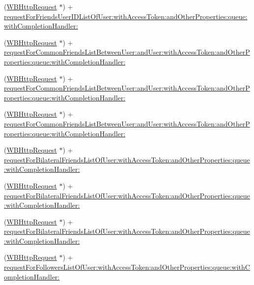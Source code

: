 \begin{DoxyCompactItemize}
(\mbox{\hyperlink{interface_w_b_http_request}{W\+B\+Http\+Request}} $\ast$) + \mbox{\hyperlink{interface_w_b_http_request_a388ba16ea6e89e121893833f2a7d7b86}{request\+For\+Friends\+User\+I\+D\+List\+Of\+User\+:with\+Access\+Token\+:and\+Other\+Properties\+:queue\+:with\+Completion\+Handler\+:}}
\item 
(\mbox{\hyperlink{interface_w_b_http_request}{W\+B\+Http\+Request}} $\ast$) + \mbox{\hyperlink{interface_w_b_http_request_a869234d6cc01353dcfc8f0f47ad06f5c}{request\+For\+Common\+Friends\+List\+Between\+User\+:and\+User\+:with\+Access\+Token\+:and\+Other\+Properties\+:queue\+:with\+Completion\+Handler\+:}}
\item 
(\mbox{\hyperlink{interface_w_b_http_request}{W\+B\+Http\+Request}} $\ast$) + \mbox{\hyperlink{interface_w_b_http_request_a869234d6cc01353dcfc8f0f47ad06f5c}{request\+For\+Common\+Friends\+List\+Between\+User\+:and\+User\+:with\+Access\+Token\+:and\+Other\+Properties\+:queue\+:with\+Completion\+Handler\+:}}
\item 
(\mbox{\hyperlink{interface_w_b_http_request}{W\+B\+Http\+Request}} $\ast$) + \mbox{\hyperlink{interface_w_b_http_request_a869234d6cc01353dcfc8f0f47ad06f5c}{request\+For\+Common\+Friends\+List\+Between\+User\+:and\+User\+:with\+Access\+Token\+:and\+Other\+Properties\+:queue\+:with\+Completion\+Handler\+:}}
\item 
(\mbox{\hyperlink{interface_w_b_http_request}{W\+B\+Http\+Request}} $\ast$) + \mbox{\hyperlink{interface_w_b_http_request_a8266e8e1c5230407f29ee63e05e98b38}{request\+For\+Bilateral\+Friends\+List\+Of\+User\+:with\+Access\+Token\+:and\+Other\+Properties\+:queue\+:with\+Completion\+Handler\+:}}
\item 
(\mbox{\hyperlink{interface_w_b_http_request}{W\+B\+Http\+Request}} $\ast$) + \mbox{\hyperlink{interface_w_b_http_request_a8266e8e1c5230407f29ee63e05e98b38}{request\+For\+Bilateral\+Friends\+List\+Of\+User\+:with\+Access\+Token\+:and\+Other\+Properties\+:queue\+:with\+Completion\+Handler\+:}}
\item 
(\mbox{\hyperlink{interface_w_b_http_request}{W\+B\+Http\+Request}} $\ast$) + \mbox{\hyperlink{interface_w_b_http_request_a8266e8e1c5230407f29ee63e05e98b38}{request\+For\+Bilateral\+Friends\+List\+Of\+User\+:with\+Access\+Token\+:and\+Other\+Properties\+:queue\+:with\+Completion\+Handler\+:}}
\item 
(\mbox{\hyperlink{interface_w_b_http_request}{W\+B\+Http\+Request}} $\ast$) + \mbox{\hyperlink{interface_w_b_http_request_a0437dae63fa8fe40c7c5b323b45e0094}{request\+For\+Followers\+List\+Of\+User\+:with\+Access\+Token\+:and\+Other\+Properties\+:queue\+:with\+Completion\+Handler\+:}}

\end{DoxyCompactItemize}
